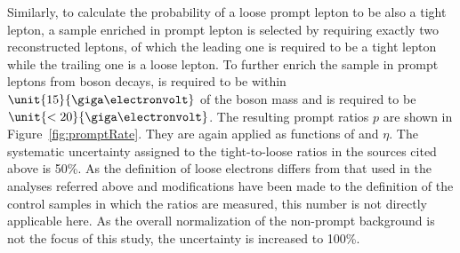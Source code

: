 Similarly, to calculate the probability of a loose prompt lepton to be also a tight lepton, a sample enriched in prompt lepton is selected by requiring exactly two reconstructed leptons, of which the leading one is required to be a tight lepton while the trailing one is a loose lepton. To further enrich the sample in prompt leptons from \Z boson decays, \mll is required to be within $\unit{15}{\giga\electronvolt}$ of the \Z boson mass and \MET is required to be $\unit{<20}{\giga\electronvolt}$. The resulting prompt ratios $p$ are shown in Figure~\ref{fig:promptRate}. They are again applied as functions of \pt and $\eta$. The systematic uncertainty assigned to the tight-to-loose ratios in the sources cited above is 50\%. As the definition of loose electrons differs from that used in the analyses referred above and modifications have been made to the definition of the control samples in which the ratios are measured, this number is not directly applicable here. As the overall normalization of the non-prompt background is not the focus of this study, the uncertainty is increased to 100\%. 

